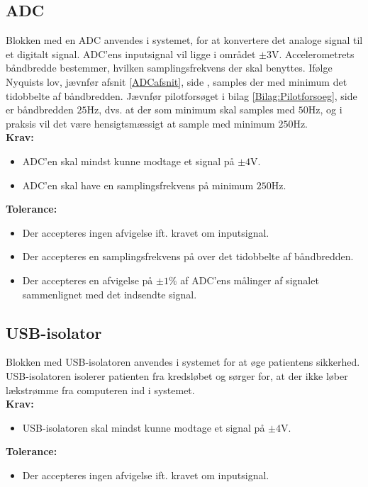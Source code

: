 \subsection{ADC}\label{ADC_kravspecifikation}
Blokken med en ADC anvendes i systemet, for at konvertere det analoge signal til et digitalt signal. %
ADC'ens inputsignal vil ligge i området $\pm3$V. Accelerometrets båndbredde bestemmer, hvilken samplingsfrekvens der skal benyttes. Ifølge Nyquists lov, jævnfør afsnit \ref{ADCafsnit}, side \pageref{ADCafsnit}, samples der med minimum det tidobbelte af båndbredden. Jævnfør pilotforsøget i bilag \ref{Bilag:Pilotforsoeg}, side \pageref{Bilag:Pilotforsoeg} er båndbredden $25$Hz, dvs. at der som minimum skal samples med $50$Hz, og i praksis vil det være hensigtsmæssigt at sample med minimum $250$Hz. \\
\textbf{Krav:}
\begin{itemize}
	\item ADC'en skal mindst kunne modtage et signal på $\pm4$V.
	\item ADC'en skal have en samplingsfrekvens på minimum $250$Hz.
\end{itemize}
\textbf{Tolerance:}
\begin{itemize}
	\item Der accepteres ingen afvigelse ift. kravet om inputsignal.
	\item Der accepteres en samplingsfrekvens på over det tidobbelte af båndbredden.
	\item Der accepteres en afvigelse på $\pm1\%$ af ADC'ens målinger af signalet sammenlignet med det indsendte signal.
\end{itemize}
\subsection{USB-isolator}\label{kravspecifikationer_USB}
Blokken med USB-isolatoren anvendes i systemet for at øge patientens sikkerhed. USB-isolatoren isolerer patienten fra kredsløbet og sørger for, at der ikke løber lækstrømme fra computeren ind i systemet.\\
\textbf{Krav:}
\begin{itemize}
	\item USB-isolatoren skal mindst kunne modtage et signal på $\pm4$V.  
\end{itemize}
\textbf{Tolerance:} 
\begin{itemize}
	\item Der accepteres ingen afvigelse ift. kravet om inputsignal. 
\end{itemize}
